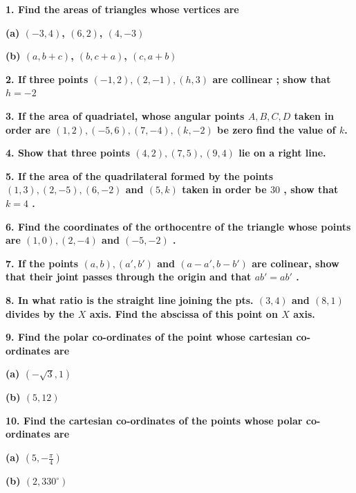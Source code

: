 \documentclass{article}
\begin{document}
\begin{flushleft}
\textbf{1. Find the areas of triangles whose vertices are}\par
\textbf{(a) $(-3, 4)$, $(6, 2)$, $(4, -3)$}\par
\textbf{(b) $(a, b+c)$, $(b, c+a)$, $(c, a+b)$}\par
\vspace{0.4cm}
\textbf{2. If three points $(-1, 2), (2, -1),(h,3)$ are collinear ; show that $h=-2$}\par
\vspace{0.4cm}
\textbf{3. If the area of quadriatel, whose angular points $A, B, C, D$ taken in order are $(1,2),(-5,6),(7,-4),(k,-2)$ be zero find the value of $k$.}\par
\vspace{0.4cm}
\textbf{4. Show that three points $(4,2),(7,5),(9,4)$ lie on a right line.}\par
\vspace{0.4cm}
\textbf{5. If the area of the quadrilateral formed by the points $(1,3),(2,-5),(6,-2)$ and $(5,k)$ taken in order be $30$ , show that $k=4$ . }\par
\vspace{0.4cm}
\textbf{6. Find the coordinates of the orthocentre of the triangle whose points are $(1,0),(2,-4)$ and $(-5,-2)$ .}\par
\vspace{0.4cm}
\textbf{7. If the points $(a,b),(a',b')$ and $(a-a' , b-b')$ are colinear, show that their joint passes through the origin and that $ab'=ab'$ .}\par
\vspace{0.4cm}
\textbf{8. In what ratio is the straight line joining the pts. $(3,4)$ and $(8,1)$ divides by the $X$ axis. Find the abscissa of this point on $X$ axis.}\par
\vspace{0.4cm}
\textbf{9. Find the polar co-ordinates of the point whose cartesian co-ordinates are}\par
\textbf{(a) $(-\sqrt{3},1)$  }\par
\textbf{(b) $(5,12)$}\par
\vspace{0.4cm}
\textbf{10. Find the cartesian co-ordinates of the points whose polar co-ordinates are}\par
\textbf{(a) $(5, -\frac{\pi}{4})$}\par
\textbf{(b) $(2, 330^{\circ})$}\par
\vspace{0.4cm}

\end{flushleft}
\end{document}
